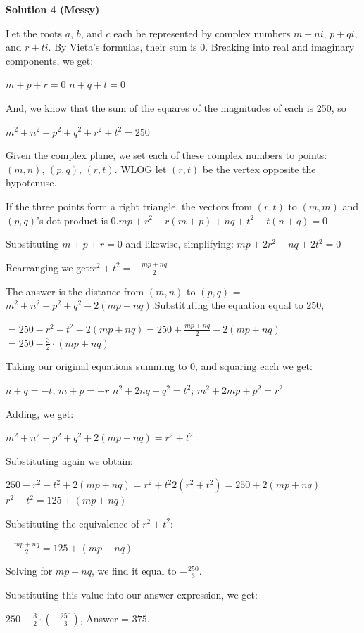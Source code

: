 \begin{enumerate}
\textbf{Solution 4 (Messy)}

Let the roots $a$, $b$, and $c$ each be represented by complex numbers $m + ni$, $p + qi$, and $r + ti$. By Vieta's formulas, their sum is 0. Breaking into real and imaginary components, we get:

 $m + p + r = 0$
$n + q + t = 0$

 And, we know that the sum of the squares of the magnitudes of each is 250, so

 $m^2 + n^2 + p^2 + q^2 + r^2 + t^2 = 250$

 Given the complex plane, we set each of these complex numbers to points: $(m, n)$, $(p, q)$, $(r, t)$. WLOG let $(r, t)$ be the vertex opposite the hypotenuse.

 If the three points form a right triangle, the vectors from $(r, t)$ to $(m, m)$ and $(p, q)$'s dot product is 0.$mp + r^2 - r(m + p) + nq + t^2 - t(n + q) = 0$

 Substituting $m + p + r = 0$ and likewise, simplifying: $mp + 2r^2 + nq + 2t^2 = 0$

 Rearranging we get:$r^2 + t^2 = -\frac{mp + nq}{2}$

 The answer is the distance from $(m, n)$ to $(p, q)$ = $m^2 + n^2 + p^2 + q^2 - 2(mp + nq)$.Substituting the equation equal to 250,

 $= 250 - r^2 - t^2 - 2(mp + nq)$$= 250 + \frac{mp + nq}{2} - 2(mp + nq)$$= 250 - \frac{3}{2} \cdot (mp + nq)$

 Taking our original equations summing to 0, and squaring each we get:

 $n + q = -t$; $m + p = -r$
$n^2 + 2nq + q^2 = t^2$; $m^2 + 2mp + p^2 = r^2$

 Adding, we get: 

 $m^2 + n^2 + p^2 + q^2 + 2(mp + nq) = r^2 + t^2$

 Substituting again we obtain:

 $250 - r^2 - t^2 + 2(mp + nq) = r^2 + t^2$$2(r^2 + t^2) = 250 + 2(mp + nq)$$r^2 + t^2 = 125 + (mp + nq)$

 Substituting the equivalence of $r^2 + t^2$:

 $-\frac{mp + nq}{2} = 125 + (mp + nq)$

 Solving for $mp + nq$, we find it equal to $-\frac{250}{3}$.

 Substituting this value into our answer expression, we get:

 $250 - \frac{3}{2} \cdot (-\frac{250}{3})$, Answer = $\boxed{375}$.


\end{enumerate}
